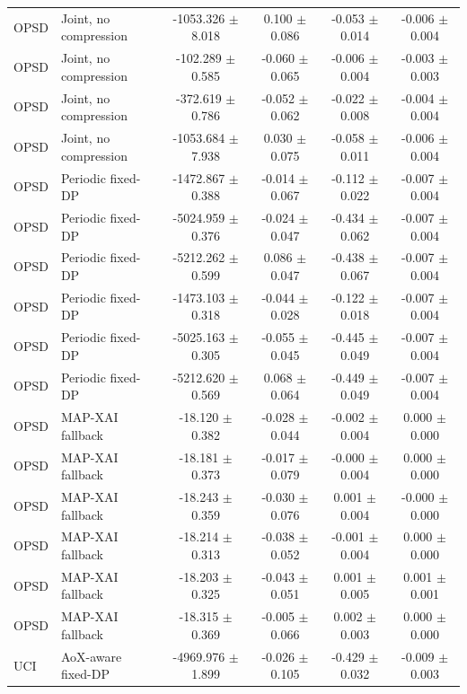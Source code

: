\begin{table}[t]
\begin{tabular}{llcccc}
OPSD & Joint, no compression & -1053.326 $\pm$ 8.018 & 0.100 $\pm$ 0.086 & -0.053 $\pm$ 0.014 & -0.006 $\pm$ 0.004 \\
OPSD & Joint, no compression & -102.289 $\pm$ 0.585 & -0.060 $\pm$ 0.065 & -0.006 $\pm$ 0.004 & -0.003 $\pm$ 0.003 \\
OPSD & Joint, no compression & -372.619 $\pm$ 0.786 & -0.052 $\pm$ 0.062 & -0.022 $\pm$ 0.008 & -0.004 $\pm$ 0.004 \\
OPSD & Joint, no compression & -1053.684 $\pm$ 7.938 & 0.030 $\pm$ 0.075 & -0.058 $\pm$ 0.011 & -0.006 $\pm$ 0.004 \\
OPSD & Periodic fixed-DP & -1472.867 $\pm$ 0.388 & -0.014 $\pm$ 0.067 & -0.112 $\pm$ 0.022 & -0.007 $\pm$ 0.004 \\
OPSD & Periodic fixed-DP & -5024.959 $\pm$ 0.376 & -0.024 $\pm$ 0.047 & -0.434 $\pm$ 0.062 & -0.007 $\pm$ 0.004 \\
OPSD & Periodic fixed-DP & -5212.262 $\pm$ 0.599 & 0.086 $\pm$ 0.047 & -0.438 $\pm$ 0.067 & -0.007 $\pm$ 0.004 \\
OPSD & Periodic fixed-DP & -1473.103 $\pm$ 0.318 & -0.044 $\pm$ 0.028 & -0.122 $\pm$ 0.018 & -0.007 $\pm$ 0.004 \\
OPSD & Periodic fixed-DP & -5025.163 $\pm$ 0.305 & -0.055 $\pm$ 0.045 & -0.445 $\pm$ 0.049 & -0.007 $\pm$ 0.004 \\
OPSD & Periodic fixed-DP & -5212.620 $\pm$ 0.569 & 0.068 $\pm$ 0.064 & -0.449 $\pm$ 0.049 & -0.007 $\pm$ 0.004 \\
OPSD & MAP-XAI fallback & -18.120 $\pm$ 0.382 & -0.028 $\pm$ 0.044 & -0.002 $\pm$ 0.004 & 0.000 $\pm$ 0.000 \\
OPSD & MAP-XAI fallback & -18.181 $\pm$ 0.373 & -0.017 $\pm$ 0.079 & -0.000 $\pm$ 0.004 & 0.000 $\pm$ 0.000 \\
OPSD & MAP-XAI fallback & -18.243 $\pm$ 0.359 & -0.030 $\pm$ 0.076 & 0.001 $\pm$ 0.004 & -0.000 $\pm$ 0.000 \\
OPSD & MAP-XAI fallback & -18.214 $\pm$ 0.313 & -0.038 $\pm$ 0.052 & -0.001 $\pm$ 0.004 & 0.000 $\pm$ 0.000 \\
OPSD & MAP-XAI fallback & -18.203 $\pm$ 0.325 & -0.043 $\pm$ 0.051 & 0.001 $\pm$ 0.005 & 0.001 $\pm$ 0.001 \\
OPSD & MAP-XAI fallback & -18.315 $\pm$ 0.369 & -0.005 $\pm$ 0.066 & 0.002 $\pm$ 0.003 & 0.000 $\pm$ 0.000 \\
UCI & AoX-aware fixed-DP & -4969.976 $\pm$ 1.899 & -0.026 $\pm$ 0.105 & -0.429 $\pm$ 0.032 & -0.009 $\pm$ 0.003 \\

\end{tabular}
\end{table}
